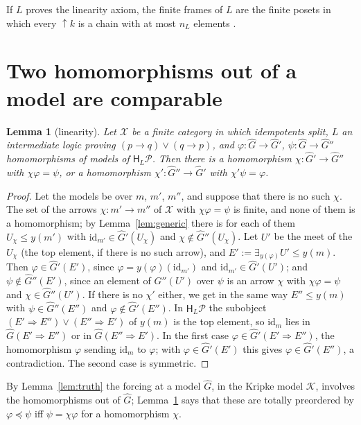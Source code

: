 \documentclass[11pt]{amsart}
\newtheorem{lem}[thm]{Lemma}
\theoremstyle{definition}
\newcommand{\HH}{\mathsf H}
\newcommand{\cX}{\mathcal X}
\newcommand{\cP}{\mathcal P}
\newcommand{\cK}{\mathcal K}
\newcommand{\id}{\mathrm{id}}
\begin{document}
If $L$ proves the linearity axiom, the finite frames of $L$ are the
finite posets in which every $\uparrow\!k$ is a chain with at most
$n_L$ elements \cite[Lemma~3.1]{Interm}.

\section{Two homomorphisms out of a model are comparable}

\begin{lem}[linearity]\label{lem:linear}
Let $\cX$ be a finite category in which idempotents split, $L$ an
intermediate logic proving $(p\to q)\vee(q\to p)$, and $\varphi\colon
\hat G\to\hat G'$, $\psi\colon\hat G\to\hat G''$ homomorphisms of
models of $\HH_L\cP$. Then there is a homomorphism $\chi\colon\hat G'
\to\hat G''$ with $\chi\varphi=\psi$, or a homomorphism $\chi'\colon
\hat G''\to\hat G'$ with $\chi'\psi=\varphi$.
\end{lem}
\begin{proof}
Let the models be over $m$, $m'$, $m''$, and suppose that there is no
such $\chi$. The set of the arrows $\chi\colon m'\to m''$ of $\cX$ with
$\chi\varphi=\psi$ is finite, and none of them is a homomorphism; by
Lemma~\ref{lem:generic} there is for each of them $U_\chi\le y(m')$
with $\id_{m'}\in\hat G'(U_\chi)$ and $\chi\notin\hat G''(U_\chi)$. Let
$U'$ be the meet of the $U_\chi$ (the top element, if there is no such
arrow), and $E':=\exists_{y(\varphi)}U'\le y(m)$. Then $\varphi\in\hat
G'(E')$, since $\varphi=y(\varphi)(\id_{m'})$ and $\id_{m'}\in\hat
G'(U')$; and $\psi\notin\hat G''(E')$, since an element of $\hat
G''(U')$ over $\psi$ is an arrow $\chi$ with $\chi\varphi=\psi$ and
$\chi\in\hat G''(U')$. If there is no $\chi'$ either, we get in the same
way $E''\le y(m)$ with $\psi\in\hat G''(E'')$ and $\varphi\notin\hat
G'(E'')$. In $\HH_L\cP$ the subobject $(E'\Rightarrow E'')\vee
(E''\Rightarrow E')$ of $y(m)$ is the top element, so $\id_m$ lies in
$\hat G(E'\Rightarrow E'')$ or in $\hat G(E''\Rightarrow E')$. In the
first case $\varphi\in\hat G'(E'\Rightarrow E'')$, the homomorphism
$\varphi$ sending $\id_m$ to $\varphi$; with $\varphi\in\hat G'(E')$
this gives $\varphi\in\hat G'(E'')$, a contradiction. The second case
is symmetric.
\end{proof}

By Lemma~\ref{lem:truth} the forcing at a model $\hat G$, in the Kripke
model $\cK$, involves the homomorphisms out of $\hat G$;
Lemma~\ref{lem:linear} says that these are totally preordered by
$\varphi\preceq\psi$ iff $\psi=\chi\varphi$ for a homomorphism $\chi$.
\end{document}
